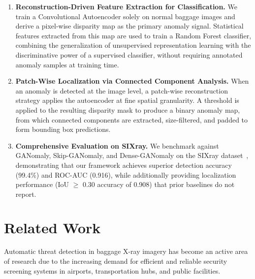 \documentclass{bmvc2k}
\begin{document}
\begin{enumerate}
	\item \textbf{Reconstruction-Driven Feature Extraction for Classification.} We 
	train a Convolutional Autoencoder solely on normal baggage images and derive a 
	pixel-wise disparity map as the primary anomaly signal. Statistical features 
	extracted from this map are used to train a Random Forest classifier, combining 
	the generalization of unsupervised representation learning with the 
	discriminative power of a supervised classifier, without requiring annotated 
	anomaly samples at training time.
	
	\item \textbf{Patch-Wise Localization via Connected Component Analysis.} When 
	an anomaly is detected at the image level, a patch-wise reconstruction strategy 
	applies the autoencoder at fine spatial granularity. A threshold is applied to 
	the resulting disparity mask to produce a binary anomaly map, from which 
	connected components are extracted, size-filtered, and padded to form 
	bounding box predictions.
	
	\item \textbf{Comprehensive Evaluation on SIXray.} We benchmark against 
	GANomaly, Skip-GANomaly, and Dense-GANomaly on the SIXray dataset~\cite{sixray2019lingxi}, 
	demonstrating that our framework achieves superior detection accuracy (99.4\%) 
	and ROC-AUC (0.916), while additionally providing localization performance 
	(IoU $\geq$ 0.30 accuracy of 0.908) that prior baselines do not report.
\end{enumerate}


\section{Related Work}
\label{sec:related}

Automatic threat detection in baggage X-ray imagery has become an active area of 
research due to the increasing demand for efficient and reliable security screening 
systems in airports, transportation hubs, and public facilities.
\end{document}
